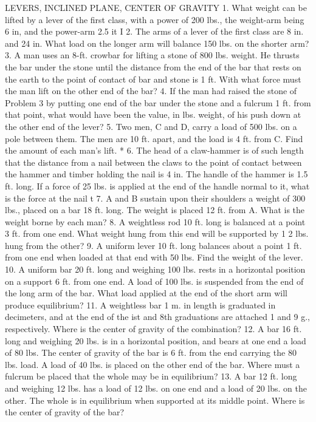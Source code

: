 LEVERS, INCLINED PLANE, CENTER OF GRAVITY
1. What weight can be lifted by a lever of the first class, with a power of 200 lbs., the weight-arm being 6 in, and the power-arm 2.5 it I
2. The arms of a lever of the first class are 8 in. and 24 in. What load on the longer arm will balance 150 lbs. on the shorter arm?
3. A man uses an 8-ft. crowbar for lifting a stone of 800 lbs. weight. He thrusts the bar under the stone until the distance from the end of the bar that rests on the earth to the point of contact of bar and stone is 1 ft. With what force must the man lift on the other end of the bar?
4. If the man had raised the stone of Problem 3 by putting one end of the bar under the stone and a fulcrum 1 ft. from that point, what would have been the value, in lbs. weight, of his push down at the other end of the lever?
5. Two men, C and D, carry a load of 500 lbs. on a pole between them. The men are 10 ft. apart, and the load is 4 ft. from C. Find the amount of each man's lift. *
6. The head of a claw-hammer is of such length that the distance from a nail between the claws to the point of contact between the hammer and timber holding the nail is 4 in. The handle of the hammer is 1.5 ft. long. If a force of 25 lbs. is applied at the end of the handle normal to it, what is the force at the nail t
7. A and B sustain upon their shoulders a weight of 300 lbs., placed on a bar 18 ft. long. The weight is placed 12 ft. from A. What is the weight borne by each man?
8. A weightless rod 10 ft. long is balanced at a point 3 ft. from one end. What weight hung from this end will be supported by 1 2 lbs. hung from the other?
9. A uniform lever 10 ft. long balances about a point 1 ft. from one end when loaded at that end with 50 lbs. Find the weight of the lever.
10. A uniform bar 20 ft. long and weighing 100 lbs. rests in a horizontal position on a support 6 ft. from one end. A load of 100 lbs. is suspended from the end of the long arm of the bar. What load applied at the end of the short arm will produce equilibrium?
11. A weightless bar 1 m. in length is graduated in decimeters, and at the end of the ist and 8th graduations are attached 1 and 9 g., respectively. Where is the center of gravity of the combination?
12. A bar 16 ft. long and weighing 20 lbs. is in a horizontal position, and bears at one end a load of 80 lbs. The center of gravity of the bar is 6 ft. from the end carrying the 80 lbs. load. A load of 40 lbs. is placed on the other end of the bar. Where must a fulcrum be placed that the whole may be in equilibrium?
13. A bar 12 ft. long and weighing 12 lbs. has a load of 12 lbs. on one end and a load of 20 lbs. on the other. The whole is in equilibrium when supported at its middle point. Where is the center of gravity of the bar?
